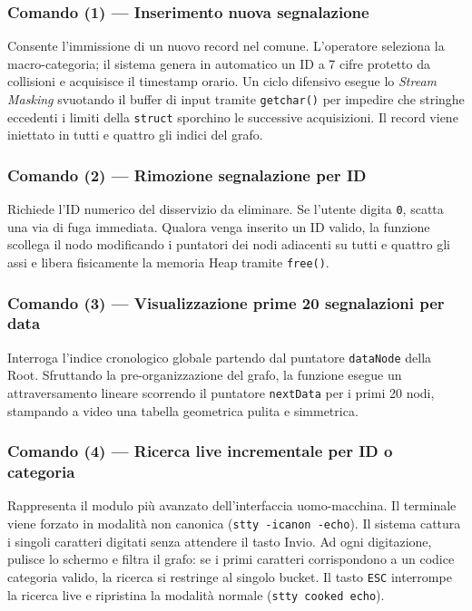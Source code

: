 \documentclass[12pt, a4paper]{article}
\begin{document}
\subsubsection{Comando (1) --- Inserimento nuova segnalazione}
Consente l'immissione di un nuovo record nel comune. L'operatore seleziona la macro-categoria; il sistema genera in automatico un ID a 7 cifre protetto da collisioni e acquisisce il timestamp orario. Un ciclo difensivo esegue lo \textit{Stream Masking} svuotando il buffer di input tramite \texttt{getchar()} per impedire che stringhe eccedenti i limiti della \texttt{struct} sporchino le successive acquisizioni. Il record viene iniettato in tutti e quattro gli indici del grafo.

\subsubsection{Comando (2) --- Rimozione segnalazione per ID}
Richiede l'ID numerico del disservizio da eliminare. Se l'utente digita \texttt{0}, scatta una via di fuga immediata. Qualora venga inserito un ID valido, la funzione scollega il nodo modificando i puntatori dei nodi adiacenti su tutti e quattro gli assi e libera fisicamente la memoria Heap tramite \texttt{free()}.

\subsubsection{Comando (3) --- Visualizzazione prime 20 segnalazioni per data}
Interroga l'indice cronologico globale partendo dal puntatore \texttt{dataNode} della Root. Sfruttando la pre-organizzazione del grafo, la funzione esegue un attraversamento lineare scorrendo il puntatore \texttt{nextData} per i primi 20 nodi, stampando a video una tabella geometrica pulita e simmetrica.

\subsubsection{Comando (4) --- Ricerca live incrementale per ID o categoria}
Rappresenta il modulo più avanzato dell'interfaccia uomo-macchina. Il terminale viene forzato in modalità non canonica (\texttt{stty -icanon -echo}). Il sistema cattura i singoli caratteri digitati senza attendere il tasto Invio. Ad ogni digitazione, pulisce lo schermo e filtra il grafo: se i primi caratteri corrispondono a un codice categoria valido, la ricerca si restringe al singolo bucket. Il tasto \texttt{ESC} interrompe la ricerca live e ripristina la modalità normale (\texttt{stty cooked echo}).
\end{document}
